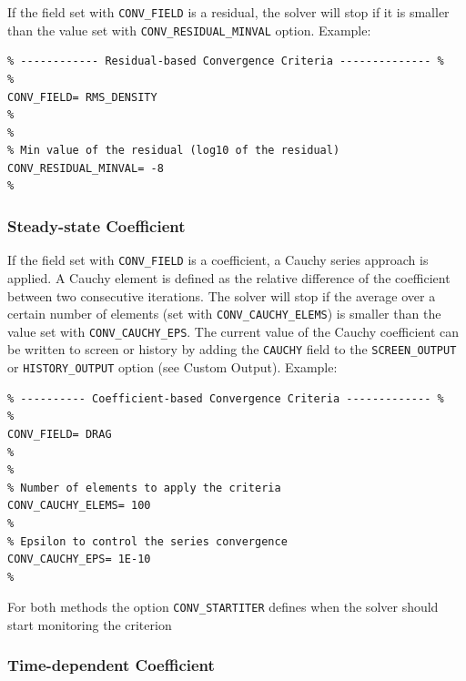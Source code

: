 \documentclass[12pt, a4paper, twoside]{article}
\begin{document}
If the field set with \verb|CONV_FIELD| is a residual, the solver will stop if it is smaller than the value set with \verb|CONV_RESIDUAL_MINVAL| option. Example:


\begin{lstlisting}
% ------------ Residual-based Convergence Criteria -------------- %
%
CONV_FIELD= RMS_DENSITY
%
%
% Min value of the residual (log10 of the residual)
CONV_RESIDUAL_MINVAL= -8
%
\end{lstlisting}

\subsubsection{Steady-state Coefficient}

If the field set with \verb|CONV_FIELD| is a coefficient, a Cauchy series approach is applied. A Cauchy element is defined as the relative difference of the coefficient between two consecutive iterations. The solver will stop if the average over a certain number of elements (set with \verb|CONV_CAUCHY_ELEMS|) is smaller than the value set with \verb|CONV_CAUCHY_EPS|. The current value of the Cauchy coefficient can be written to screen or history by adding the \verb|CAUCHY| field to the \verb|SCREEN_OUTPUT| or \verb|HISTORY_OUTPUT| option (see Custom Output). Example:


\begin{lstlisting}
% ---------- Coefficient-based Convergence Criteria ------------- %
%
CONV_FIELD= DRAG
%
%
% Number of elements to apply the criteria
CONV_CAUCHY_ELEMS= 100
%
% Epsilon to control the series convergence
CONV_CAUCHY_EPS= 1E-10
%

\end{lstlisting}
For both methods the option \verb|CONV_STARTITER| defines when the solver should start monitoring the criterion


\subsubsection{Time-dependent Coefficient}
\end{document}
